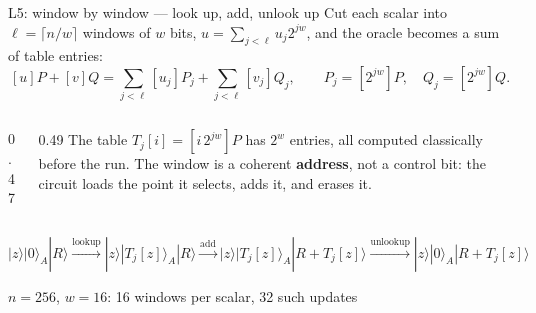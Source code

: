 \documentclass[aspectratio=169,11pt]{beamer}
\begin{document}
\begin{frame}{L5: window by window --- look up, add, unlook up}
  \small Cut each scalar into $\ell=\lceil n/w\rceil$ windows of $w$ bits, $u=\sum_{j<\ell}u_j2^{jw}$, and the oracle becomes a sum of table entries:
  \[ [u]P+[v]Q=\sum_{j<\ell}[u_j]P_j+\sum_{j<\ell}[v_j]Q_j,\qquad P_j=[2^{jw}]P,\quad Q_j=[2^{jw}]Q . \]
  \begin{columns}[c]
    \begin{column}{0.47\textwidth}
      \centering
    \end{column}
    \begin{column}{0.49\textwidth}
      \small The table $T_j[i]=[i\,2^{jw}]P$ has $2^w$ entries, all computed classically before the run. The window is a coherent \textbf{address}, not a control bit: the circuit loads the point it selects, adds it, and erases it.
    \end{column}
  \end{columns}
  \vskip2mm
  \centering\footnotesize
  $|z\rangle|0\rangle_A|R\rangle\xrightarrow{\text{lookup}}|z\rangle|T_j[z]\rangle_A|R\rangle\xrightarrow{\text{add}}|z\rangle|T_j[z]\rangle_A|R+T_j[z]\rangle\xrightarrow{\text{unlookup}}|z\rangle|0\rangle_A|R+T_j[z]\rangle$\par
  \vskip1mm
  {\scriptsize $n=256$, $w=16$: 16 windows per scalar, 32 such updates}
\end{frame}
\end{document}
